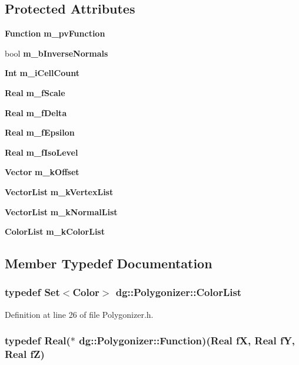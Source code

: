 \subsection*{Protected Attributes}
\begin{CompactItemize}
\item 
{\bf Function} {\bf m\_\-pv\-Function}
\item 
bool {\bf m\_\-b\-Inverse\-Normals}
\item 
{\bf Int} {\bf m\_\-i\-Cell\-Count}
\item 
{\bf Real} {\bf m\_\-f\-Scale}
\item 
{\bf Real} {\bf m\_\-f\-Delta}
\item 
{\bf Real} {\bf m\_\-f\-Epsilon}
\item 
{\bf Real} {\bf m\_\-f\-Iso\-Level}
\item 
{\bf Vector} {\bf m\_\-k\-Offset}
\item 
{\bf Vector\-List} {\bf m\_\-k\-Vertex\-List}
\item 
{\bf Vector\-List} {\bf m\_\-k\-Normal\-List}
\item 
{\bf Color\-List} {\bf m\_\-k\-Color\-List}
\end{CompactItemize}


\subsection{Member Typedef Documentation}
\subsubsection{\setlength{\rightskip}{0pt plus 5cm}typedef {\bf Set}$<${\bf Color}$>$ dg::Polygonizer::Color\-List}\label{classdg_1_1Polygonizer_s0}




Definition at line 26 of file Polygonizer.h.
\subsubsection{\setlength{\rightskip}{0pt plus 5cm}typedef {\bf Real}($\ast$ dg::Polygonizer::Function)({\bf Real} f\-X, {\bf Real} f\-Y, {\bf Real} f\-Z)}\label{classdg_1_1Polygonizer_s2}




